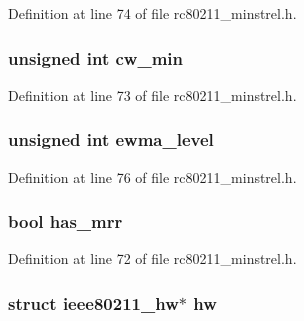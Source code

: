 Definition at line 74 of file rc80211\-\_\-minstrel.\-h.

\hypertarget{structminstrel__priv_a5dfb3e843935ac3ab5af58d5b1626233}{
\subsubsection[{cw\-\_\-min}]{\setlength{\rightskip}{0pt plus 5cm}unsigned int cw\-\_\-min}}\label{structminstrel__priv_a5dfb3e843935ac3ab5af58d5b1626233}


Definition at line 73 of file rc80211\-\_\-minstrel.\-h.

\hypertarget{structminstrel__priv_a15186641e34e1ec343ccc43ee048ff07}{
\subsubsection[{ewma\-\_\-level}]{\setlength{\rightskip}{0pt plus 5cm}unsigned int ewma\-\_\-level}}\label{structminstrel__priv_a15186641e34e1ec343ccc43ee048ff07}


Definition at line 76 of file rc80211\-\_\-minstrel.\-h.

\hypertarget{structminstrel__priv_a0ee069a8859cfa7d2af69c0a0527c29a}{
\subsubsection[{has\-\_\-mrr}]{\setlength{\rightskip}{0pt plus 5cm}bool has\-\_\-mrr}}\label{structminstrel__priv_a0ee069a8859cfa7d2af69c0a0527c29a}


Definition at line 72 of file rc80211\-\_\-minstrel.\-h.

\hypertarget{structminstrel__priv_aa12d77b0381baac0e9692c9a7a108d72}{
\subsubsection[{hw}]{\setlength{\rightskip}{0pt plus 5cm}struct ieee80211\-\_\-hw$\ast$ hw}}\label{structminstrel__priv_aa12d77b0381baac0e9692c9a7a108d72}


